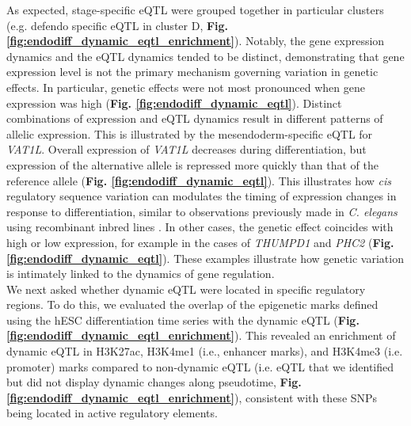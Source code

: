 As expected, stage-specific eQTL were grouped together in particular clusters (e.g. defendo specific eQTL in cluster D, \textbf{Fig. \ref{fig:endodiff_dynamic_eqtl_enrichment}}). 
Notably, the gene expression dynamics and the eQTL dynamics tended to be distinct, demonstrating that gene expression level is not the primary mechanism governing variation in genetic effects. 
In particular, genetic effects were not most pronounced when gene expression was high (\textbf{Fig. \ref{fig:endodiff_dynamic_eqtl}}).
Distinct combinations of expression and eQTL dynamics result in different patterns of allelic expression. 
This is illustrated by the mesendoderm-specific eQTL for \textit{VAT1L}. 
Overall expression of \textit{VAT1L} decreases during differentiation, but expression of the alternative allele is repressed more quickly than that of the reference allele (\textbf{Fig. \ref{fig:endodiff_dynamic_eqtl}}). 
This illustrates how \textit{cis} regulatory sequence variation can modulates the timing of expression changes in response to differentiation, similar to observations previously made in \textit{C. elegans} using recombinant inbred lines \cite{francesconi2014effects}. 
In other cases, the genetic effect coincides with high or low expression, for example in the cases of \textit{THUMPD1} and \textit{PHC2} (\textbf{Fig. \ref{fig:endodiff_dynamic_eqtl}}). 
These examples illustrate how genetic variation is intimately linked to the dynamics of gene regulation. \\

We next asked whether dynamic eQTL were located in specific regulatory regions. 
To do this, we evaluated the overlap of the epigenetic marks defined using the hESC differentiation time series with the dynamic eQTL (\textbf{Fig. \ref{fig:endodiff_dynamic_eqtl_enrichment}}). 
This revealed an enrichment of dynamic eQTL in H3K27ac, H3K4me1 (i.e., enhancer marks), and H3K4me3 (i.e. promoter) marks compared to non-dynamic eQTL (i.e. eQTL that we identified but did not display dynamic changes along pseudotime, \textbf{Fig. \ref{fig:endodiff_dynamic_eqtl_enrichment}}), consistent with these SNPs being located in active regulatory elements.


